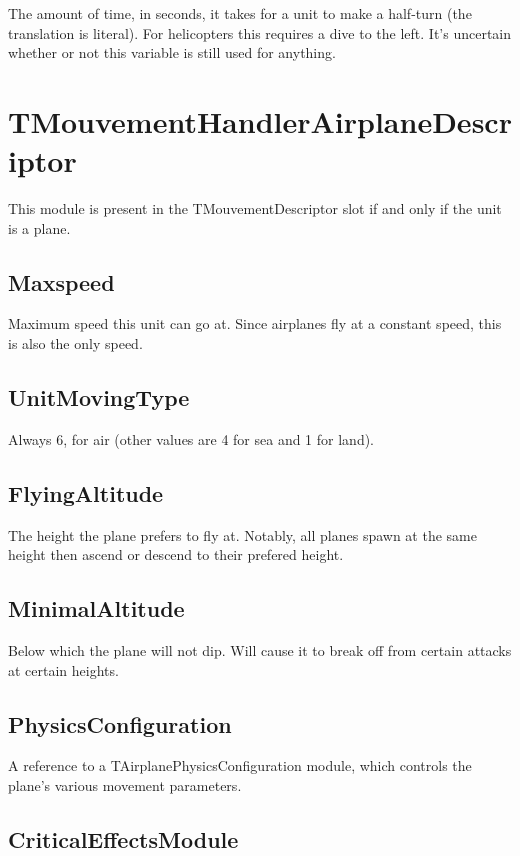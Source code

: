 \documentclass{article}
\begin{document}
The amount of time, in seconds, it takes for a unit to make a half-turn (the translation is literal). For helicopters this requires a dive to the left. It's uncertain whether or not this variable is still used for anything.

\section{TMouvementHandlerAirplaneDescriptor}

This module is present in the TMouvementDescriptor slot if and only if the unit is a plane.

\subsection{Maxspeed}

Maximum speed this unit can go at. Since airplanes fly at a constant speed, this is also the only speed.

\subsection{UnitMovingType}

Always 6, for air (other values are 4 for sea and 1 for land).

\subsection{FlyingAltitude}

The height the plane prefers to fly at. Notably, all planes spawn at the same height then ascend or descend to their prefered height.

\subsection{MinimalAltitude}

Below which the plane will not dip. Will cause it to break off from certain attacks at certain heights.

\subsection{PhysicsConfiguration}

A reference to a TAirplanePhysicsConfiguration module, which controls the plane's various movement parameters.

\subsection{CriticalEffectsModule}
\end{document}
